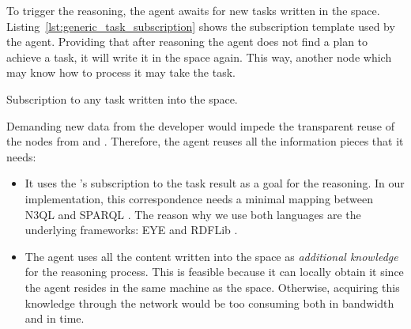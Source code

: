 To trigger the reasoning, the agent awaits for new tasks written in the space.
Listing~\ref{lst:generic_task_subscription} shows the subscription template used by the agent.
Providing that after reasoning the agent does not find a plan to achieve a task, it will write it in the space again.
This way, another node which may know how to process it may take the task. %


\begin{listing}
  
  \caption{Subscription to any task written into the space.}
  \label{lst:generic_task_subscription}
\end{listing}


Demanding new data from the developer would impede the transparent reuse of the nodes from \implSpace{} and \implRest{}.
Therefore, the agent reuses all the information pieces that it needs:
\begin{itemize}
  \item It uses the \nodeConsSpace{}'s subscription to the task result as a goal for the reasoning.
	In our implementation, this correspondence needs a minimal mapping between N3QL  and SPARQL .
	The reason why we use both languages are the underlying frameworks: EYE  and RDFLib .
	
  \item The agent uses all the content written into the space as \emph{additional knowledge} for the reasoning process.
	This is feasible because it can locally obtain it since the agent resides in the same machine as the space.
	Otherwise, acquiring this knowledge through the network would be too consuming both in bandwidth and in time.
\end{itemize}


